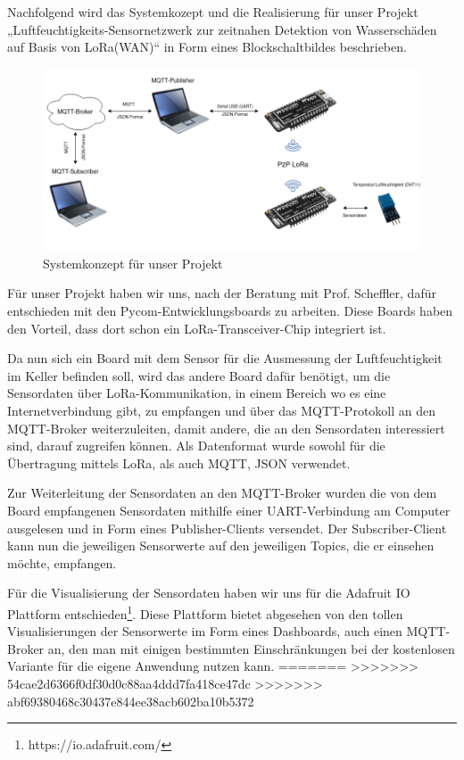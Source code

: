 Nachfolgend wird das Systemkozept und die Realisierung für unser Projekt „Luftfeuchtigkeits-Sensornetzwerk zur zeitnahen Detektion von Wasserschäden auf Basis von LoRa(WAN)“ in Form eines Blockschaltbildes beschrieben. 

\begin{figure}[h]
 \centering
 \includegraphics[width=1\textwidth]{pictures/Blockschaltbild_ProNeSy}
 \caption[Systemkonzept für unser Projekt]{Systemkonzept für unser Projekt}
 \label{fig:systemkonzept}
\end{figure}

Für unser Projekt haben wir uns, nach der Beratung mit Prof. Scheffler, dafür entschieden mit den Pycom-Entwicklungsboards zu arbeiten. Diese Boards haben den Vorteil, dass dort schon ein LoRa-Transceiver-Chip integriert ist. 

Da nun sich ein Board mit dem Sensor für die Ausmessung der Luftfeuchtigkeit im Keller befinden soll, wird das andere Board dafür benötigt, um die Sensordaten über LoRa-Kommunikation, in einem Bereich wo es eine Internetverbindung gibt, zu empfangen und über das MQTT-Protokoll an den MQTT-Broker weiterzuleiten, damit andere, die an den Sensordaten interessiert sind, darauf zugreifen können. Als Datenformat wurde sowohl für die Übertragung mittels LoRa, als auch MQTT, JSON verwendet.

Zur Weiterleitung der Sensordaten an den MQTT-Broker wurden die von dem Board empfangenen Sensordaten mithilfe einer UART-Verbindung am Computer ausgelesen und in Form eines Publisher-Clients versendet. Der Subscriber-Client kann nun die jeweiligen Sensorwerte auf den jeweiligen Topics, die er einsehen möchte, empfangen.

Für die Visualisierung der Sensordaten haben wir uns für die Adafruit IO Plattform entschieden\footnote{https://io.adafruit.com/}. Diese Plattform bietet abgesehen von den tollen Visualisierungen der Sensorwerte im Form eines Dashboards, auch einen MQTT-Broker an, den man mit einigen bestimmten Einschränkungen bei der kostenlosen Variante für die eigene Anwendung nutzen kann. 
=======
>>>>>>> 54cae2d6366f0df30d0c88aa4ddd7fa418ce47dc
>>>>>>> abf69380468c30437e844ee38acb602ba10b5372
